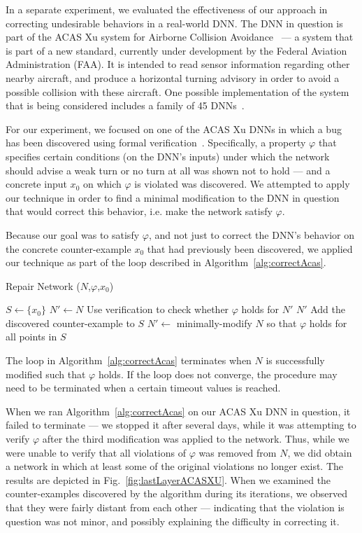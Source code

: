 \documentclass{easychair}
\begin{document}
In a separate experiment, we evaluated the effectiveness of our
approach in correcting undesirable behaviors in a real-world DNN. The
DNN in question is part of the ACAS Xu system for Airborne Collision
Avoidance~\cite{JuLoBrOwKo16} --- a system that is part of a new
standard, currently under development by the Federal Aviation
Administration (FAA). It is intended to
read sensor information regarding other nearby aircraft, and produce a
horizontal turning advisory in order to avoid a possible collision
with these aircraft. One possible implementation of the system that is
being considered includes a family of 45 DNNs~\cite{JuLoBrOwKo16}.

For our experiment, we focused on one of the ACAS Xu DNNs in which a
bug has been discovered using formal
verification~\cite{KaBaDiJuKo17Reluplex}. Specifically, a property
$\varphi$ that specifies certain conditions (on the DNN's inputs)
under which the network should advise a weak turn or no turn at all
was shown not to hold --- and a concrete input $x_0$ on which $\varphi$ is
violated was discovered. We attempted to apply our
technique in order to find a minimal modification to the DNN in question that
would correct this behavior, i.e. make the network satisfy $\varphi$.

Because our goal was to satisfy $\varphi$, and not just to correct the
DNN's behavior on the concrete counter-example $x_0$ that had previously
been discovered, we applied our technique as part of the loop
described in Algorithm~\ref{alg:correctAcas}.

\begin{algorithm}
\caption{Repair Network ($N$,$\varphi$,$x_0$)}
\begin{algorithmic}[1]
  \State $S\leftarrow \{x_0\}$
  \State $N'\leftarrow N$
  \State Use verification to check whether $\varphi$ holds for $N'$
    \State\Return $N'$
  \Else
    \State Add the discovered counter-example to $S$
    \State $N'\leftarrow$ minimally-modify $N$ so that $\varphi$
    holds for all points in $S$
    \EndIf
    \EndWhile
\end{algorithmic}
\label{alg:correctAcas}
\end{algorithm}

The loop in Algorithm~\ref{alg:correctAcas} terminates when $N$ is
successfully modified such that $\varphi$ holds. If the loop does not
converge, the procedure may need to be terminated when a certain
timeout values is reached.

When we ran Algorithm~\ref{alg:correctAcas} on our ACAS Xu DNN in
question, it failed to terminate --- we stopped it after several days, while it was attempting to verify $\varphi$ after the third modification was applied to the network. Thus, while we were unable to verify that all violations of $\varphi$ was removed from $N$, we did obtain a
network in which at least some of the original violations no longer
exist.  The results are depicted in
Fig.~\ref{fig:lastLayerACASXU}. When we examined
the counter-examples discovered by the algorithm during its
iterations, we observed that they were fairly distant from
each other --- indicating that the violation is question was not
minor, and possibly explaining the difficulty in correcting it.
\end{document}
